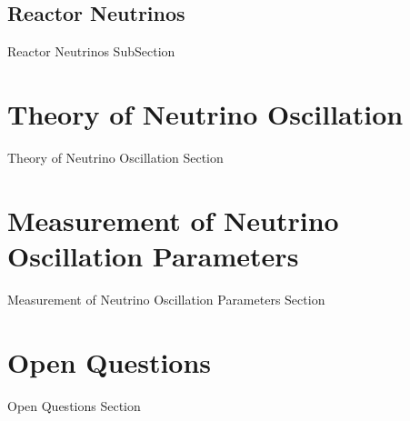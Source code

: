 \subsection{Reactor Neutrinos}
\label{subsec:NeutrinoOscillationPhysics_ReactorNeutrinos}
Reactor Neutrinos SubSection

\section{Theory of Neutrino Oscillation}
\label{sec:NeutrinoOscillationPhysics_TheoryOfNeutrinoOscillation}
Theory of Neutrino Oscillation Section

\section{Measurement of Neutrino Oscillation Parameters}
\label{sec:NeutrinoOscillationPhysics_MeasurementOfNeutrinoOscillationParameters}
Measurement of Neutrino Oscillation Parameters Section

\section{Open Questions}
\label{sec:NeutrinoOscillationPhysics_OpenQuestions}
Open Questions Section
